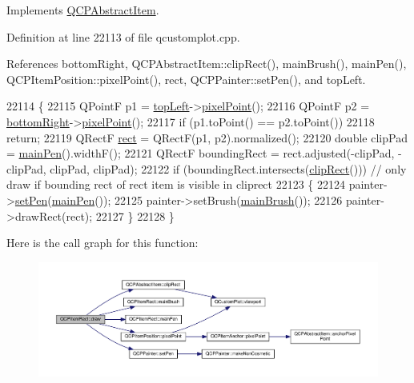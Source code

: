 Implements \hyperlink{class_q_c_p_abstract_item_ad0dc056f650c3ca73414e6b4f01674ef}{Q\+C\+P\+Abstract\+Item}.



Definition at line 22113 of file qcustomplot.\+cpp.



References bottom\+Right, Q\+C\+P\+Abstract\+Item\+::clip\+Rect(), main\+Brush(), main\+Pen(), Q\+C\+P\+Item\+Position\+::pixel\+Point(), rect, Q\+C\+P\+Painter\+::set\+Pen(), and top\+Left.


\begin{DoxyCode}
22114 \{
22115   QPointF p1 = \hyperlink{class_q_c_p_item_rect_aa70feeef173489b03c3fbe906a5023c4}{topLeft}->\hyperlink{class_q_c_p_item_position_ae490f9c76ee2ba33752c495d3b6e8fb5}{pixelPoint}();
22116   QPointF p2 = \hyperlink{class_q_c_p_item_rect_a409f3bfe615a7e322bb3d4d193d85b26}{bottomRight}->\hyperlink{class_q_c_p_item_position_ae490f9c76ee2ba33752c495d3b6e8fb5}{pixelPoint}();
22117   \textcolor{keywordflow}{if} (p1.toPoint() == p2.toPoint())
22118     \textcolor{keywordflow}{return};
22119   QRectF \hyperlink{_gen_blob_8m_aea8f6815d9a63491fc422c5572c6b3c3}{rect} = QRectF(p1, p2).normalized();
22120   \textcolor{keywordtype}{double} clipPad = \hyperlink{class_q_c_p_item_rect_afa0fb7c6328a1e197ecd537de36daf8f}{mainPen}().widthF();
22121   QRectF boundingRect = rect.adjusted(-clipPad, -clipPad, clipPad, clipPad);
22122   \textcolor{keywordflow}{if} (boundingRect.intersects(\hyperlink{class_q_c_p_abstract_item_a538e25ff8856534582f5b2b400a46405}{clipRect}())) \textcolor{comment}{// only draw if bounding rect of rect item is visible in
       cliprect}
22123   \{
22124     painter->\hyperlink{class_q_c_p_painter_af9c7a4cd1791403901f8c5b82a150195}{setPen}(\hyperlink{class_q_c_p_item_rect_afa0fb7c6328a1e197ecd537de36daf8f}{mainPen}());
22125     painter->setBrush(\hyperlink{class_q_c_p_item_rect_ab0bd8e272e822ec851ba5b0c20e9200e}{mainBrush}());
22126     painter->drawRect(rect);
22127   \}
22128 \}
\end{DoxyCode}


Here is the call graph for this function\+:\nopagebreak
\begin{figure}[H]
\begin{center}
\leavevmode
\includegraphics[width=350pt]{class_q_c_p_item_rect_a18cd583638b876cdd50f1a155ec182aa_cgraph}
\end{center}
\end{figure}


